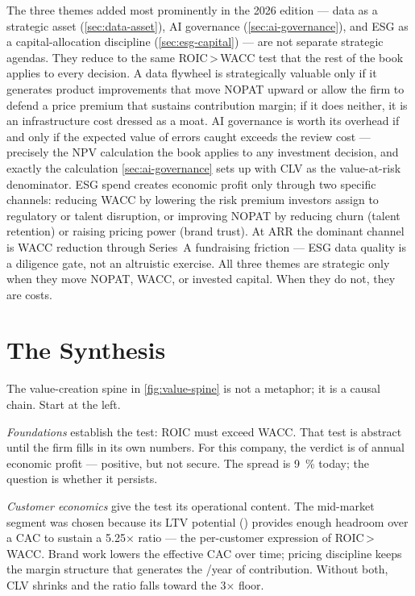 The three themes added most prominently in the 2026 edition --- data as a strategic asset
(\cref{sec:data-asset}), AI governance (\cref{sec:ai-governance}), and ESG as a
capital-allocation discipline (\cref{sec:esg-capital}) --- are not separate strategic agendas.
They reduce to the same ROIC\,>\,WACC test that the rest of the book applies to every decision.
A data flywheel is strategically valuable only if it generates product improvements that move
NOPAT upward or allow the firm to defend a price premium that sustains contribution margin; if
it does neither, it is an infrastructure cost dressed as a moat. AI governance is worth its
overhead if and only if the expected value of errors caught exceeds the review cost ---
precisely the NPV calculation the book applies to any investment decision, and exactly the
calculation \cref{sec:ai-governance} sets up with CLV as the value-at-risk denominator. ESG
spend creates economic profit only through two specific channels: reducing WACC by lowering
the risk premium investors assign to regulatory or talent disruption, or improving NOPAT by
reducing churn (talent retention) or raising pricing power (brand trust). At 
ARR the dominant channel is WACC reduction through Series~A fundraising friction --- ESG
data quality is a diligence gate, not an altruistic exercise. All three themes are strategic
only when they move NOPAT, WACC, or invested capital. When they do not, they are costs.

\section{The Synthesis}\label{sec:capstone-synthesis}

The value-creation spine in \cref{fig:value-spine} is not a metaphor; it is a causal chain.
Start at the left.

\emph{Foundations} establish the test: ROIC must exceed WACC. That test is abstract until
the firm fills in its own numbers. For this company, the verdict is  of annual
economic profit --- positive, but not secure. The spread is \qty{9}{\percent} today; the
question is whether it persists.

\emph{Customer economics} give the test its operational content. The mid-market segment was
chosen because its LTV potential () provides enough headroom over a 
CAC to sustain a 5.25× ratio --- the per-customer expression of ROIC\,>\,WACC. Brand work
lowers the effective CAC over time; pricing discipline keeps the margin structure that
generates the /year of contribution. Without both, CLV shrinks and the ratio
falls toward the 3× floor.

